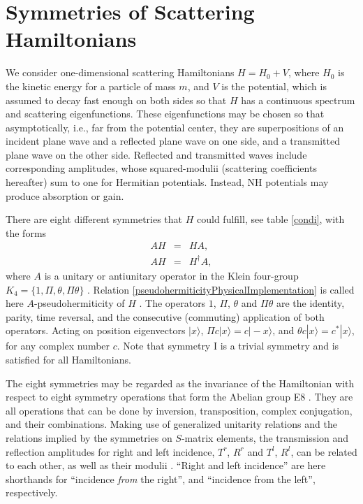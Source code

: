 %
%
%
\section{Symmetries of Scattering Hamiltonians\label{ssh}}
%
%
We consider one-dimensional  scattering Hamiltonians  $H=H_0+V$, where $H_{0}$
is the kinetic energy for a particle of mass $m$,
and
$V$ is the  potential, which is assumed to decay fast enough on both sides so that $H$ has a continuous spectrum and scattering eigenfunctions. These eigenfunctions may be chosen so that asymptotically, i.e., far from the potential center,  they are superpositions of an incident plane wave and a reflected plane wave on one side, and a transmitted plane wave on the other side. Reflected and transmitted waves include corresponding amplitudes, whose squared-modulii
(scattering coefficients hereafter) sum to one for Hermitian potentials. Instead, NH potentials
may produce  absorption or gain.


There are eight different symmetries that $H$ could fulfill, see table \ref{condi},
with the forms
%
\begin{eqnarray}
	AH&=&HA,
	\\
	AH&=&H^{\dagger}A,
	\label{pseudohermiticityPhysicalImplementation}
\end{eqnarray}
%
%
where $A$ is a unitary or antiunitary operator in the Klein four-group $K_{4}=\lbrace 1,\Pi,\theta,\Pi\theta \rbrace$ \cite{Ruschhaupt2017}.
Relation \eqref{pseudohermiticityPhysicalImplementation} is called here $A$-pseudohermiticity of $H$ \cite{Mostafazadeh2010,Ruschhaupt2017}.
The operators $1$, $\Pi$, $\theta$ and $\Pi\theta$ are the identity, parity, time reversal,
and the consecutive (commuting) application of both operators.
Acting on position eigenvectors $|x\rangle$,
$\Pi c|x\rangle =c|-x\rangle$, and $\theta c |x\rangle = c^* |x\rangle$, for any  complex number $c$. Note that symmetry I is a trivial symmetry and is satisfied for all Hamiltonians.

%
The eight symmetries  may be regarded as the invariance of the Hamiltonian with respect to
eight symmetry operations that form the Abelian group E8 \cite{Simon2019a}. They are all operations that can be done by inversion, transposition, complex conjugation, and their combinations.
Making use of generalized unitarity relations and  the relations implied by the symmetries on $S$-matrix elements,
the transmission and reflection amplitudes for right and left incidence, $T^r$, $R^r$ and $T^l$, $R^l$, can be  related
to each other,
as well as their modulii \cite{Ruschhaupt2017}.  ``Right and left  incidence'' are here shorthands for ``incidence {\it from} the right'',
and ``incidence { from} the left'', respectively.

